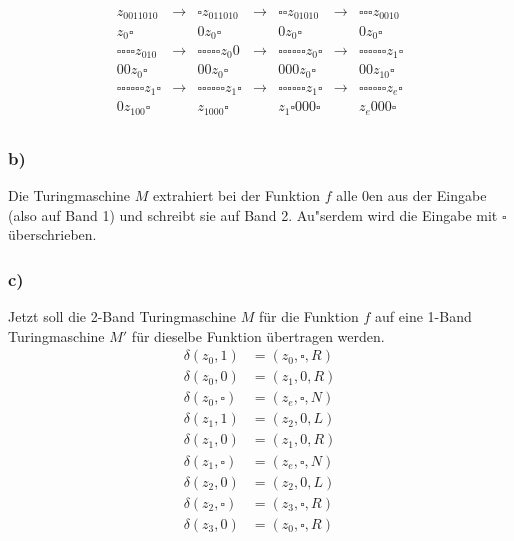 \documentclass[a4paper,12pt]{article}
\begin{document}
	\begin{align*}
		z_0011010 &\rightarrow &\square z_011010 &\rightarrow &\square \square z_01010 &\rightarrow & \square \square \square z_0010\\
		z_0 \square &  &0 z_0 \square & &0 z_0 \square & &0 z_0 \square\\
		\square \square \square \square z_010 &\rightarrow &\square \square \square \square \square z_0 0 &\rightarrow &\square \square \square \square \square \square z_0 \square &\rightarrow & \square \square \square \square \square \square z_1 \square\\
		00 z_0 \square &  &00 z_0 \square & &000 z_0 \square & &00 z_10 \square\\
		\square \square \square \square  \square \square z_1 \square &\rightarrow &\square \square \square \square  \square \square z_1 \square &\rightarrow &\square \square \square \square \square \square z_1 \square &\rightarrow & \square \square \square \square \square \square z_e \square\\
		0 z_100 \square &  &z_1000 \square & &z_1 \square 000 \square & &z_e000 \square\\
	\end{align*}
	\subsubsection*{b)}
	Die Turingmaschine $M$ extrahiert bei der Funktion $f$ alle $0$en aus der Eingabe (also auf Band 1) und schreibt sie auf Band 2. Au"serdem wird die Eingabe mit $\square$ überschrieben.\newpage
	
	\subsubsection*{c)}
	Jetzt soll die 2-Band Turingmaschine $M$ für die Funktion $f$ auf eine 1-Band Turingmaschine $M'$ für dieselbe Funktion übertragen werden.
	\begin{align*}
		\delta \left( z_0,1\right) &= \left( z_0, \square, R\right)\\
		\delta \left( z_0,0\right) &= \left( z_1, 0, R\right)\\
		\delta \left( z_0,\square\right) &= \left( z_e, \square, N\right)\\
		\delta \left( z_1,1\right) &= \left( z_2, 0, L\right)\\
		\delta \left( z_1,0\right) &= \left( z_1, 0, R\right)\\
		\delta \left( z_1,\square\right) &= \left( z_e, \square, N\right)\\
		\delta \left( z_2,0\right) &= \left( z_2, 0, L\right)\\
		\delta \left( z_2,\square\right) &= \left( z_3, \square, R\right)\\
		\delta \left( z_3,0\right) &= \left( z_0, \square, R\right)
	\end{align*}
\end{document}
